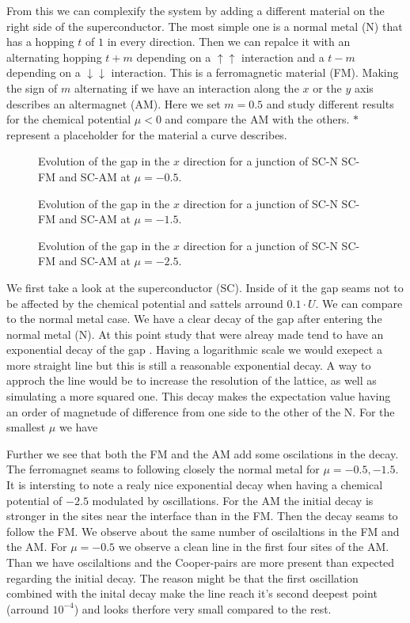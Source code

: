 \documentclass[..\main.tex]{subfile}
\begin{document}
From this we can complexify the system by adding a different material on the right side of the superconductor. 
The most simple one is a normal metal (N) that has a hopping $t$ of $1$ in every direction.
Then we can repalce it with an alternating hopping $t+m$ depending on a $\uparrow\uparrow$ interaction
and a $t-m$ depending on a $\downarrow\downarrow$ interaction. This is a ferromagnetic material (FM).
Making the sign of $m$ alternating if we have an interaction along the $x$ or the $y$ axis describes an altermagnet (AM).
Here we set $m=0.5$ and study different results for the chemical potential $\mu<0$ and compare the AM
with the others. $\ast$ represent a placeholder for the material a curve describes.\\
\begin{figure}[H]
  \centering
  
  \caption{Evolution of the gap in the $x$ direction for a junction of SC-N SC-FM and SC-AM at $\mu=-0.5$.}
\end{figure}\begin{figure}[H]
  \centering
  
  \caption{Evolution of the gap in the $x$ direction for a junction of SC-N SC-FM and SC-AM at $\mu=-1.5$.}
\end{figure}
\begin{figure}[H]
  \centering
  
  \caption{Evolution of the gap in the $x$ direction for a junction of SC-N SC-FM and SC-AM at $\mu=-2.5$.}
\end{figure}
We first take a look at the superconductor (SC). Inside of it the gap seams not to be affected by the chemical potential
and sattels arround $0.1\cdot U$. 
We can compare to the normal metal case. We have a clear decay of the gap after entering the normal metal (N). At this point 
study that were alreay made tend to have an exponential decay of the gap \cite{Mjos2019}. Having a logarithmic scale we would
exepect a more straight line but this is still a reasonable exponential decay. A way to approch the line would be to increase the 
resolution of the lattice, as well as simulating a more squared one. This decay makes the expectation value having an order of 
magnetude of difference from one side to the other of the N. For the smallest $\mu$ we have  


Further we see that both the FM and the AM add some oscilations in the decay. \\

The ferromagnet seams to following closely the normal metal for $\mu=-0.5,-1.5$. It is intersting to note a realy nice exponential
decay when having a chemical potential of $-2.5$ modulated by oscillations. For the AM the initial decay is stronger in the sites near the 
interface than in the FM. Then the decay seams to follow the FM. We observe about the same number of oscilaltions in the FM and the AM.
For $\mu=-0.5$ we observe a clean line in the first four sites of the AM. Than we have oscilaltions and the Cooper-pairs are more present
than expected regarding the initial decay. The reason might be that the first oscillation combined with the inital decay make the line
reach it's second deepest point (arround $10^{-4}$) and looks therfore very small compared to the rest.
\end{document}
